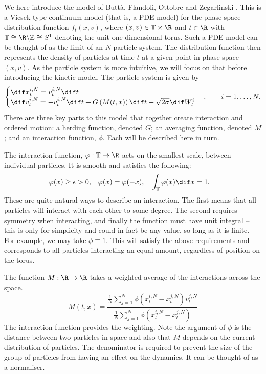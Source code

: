 We here introduce the model of Butt\`a, Flandoli, Ottobre and Zegarlinski \cite{Butta2019}. This is a Vicsek-type continuum model (that is, a PDE model) for the phase-space distribution function  $f_t(x,v)$, where $(x,v) \in \T \times \R$ and $t \in \R$ with $\T \cong \R \backslash \Z \cong S^1$ denoting the unit one-dimensional torus. Such a PDE model can be thought of as the limit of an $N$ particle system. The distribution function then represents the density of particles at time $t$ at a given point in phase space $(x,v)$. As the particle system is more intuitive, we will focus on that before introducing the kinetic model. The particle system is given by 
 \begin{equation}\label{eq:fullparticle}\begin{cases}
\dif x^{i,N}_t = v^{i,N}_t\dif t\\
\dif v^{i,N}_t = -v^{i,N}_t\dif t + G\left(M(t,x)\right)\dif t + \sqrt{2\sigma} \dif W^i_t 
\end{cases}, \qquad  i = 1,\dots,N.
\end{equation}
 There are three key parts to this model that together create interaction and ordered motion: a herding function, denoted $G$; an averaging function, denoted $M$; and an interaction function, $\phi$. Each will be described here in turn.
 
The interaction function, $\phi: \T \to \R $ acts on the smallest scale, between individual particles. It is smooth and satisfies the following:
 \begin{align}\label{eq:phi}
 \phi(x) \geq \epsilon >0, && \phi(x) = \phi(-x), &&& \int_{\T} \phi(x) \dif x = 1.
 \end{align}
 These are quite natural ways to describe an interaction. The first means that all particles will interact with each other to some degree. The second requires symmetry when interacting, and finally the function must have unit integral -- this is only for simplicity and could in fact be any value, so long as it is finite. For example, we may take $\phi \equiv 1$. This will satisfy the above requirements and corresponds to all particles interacting an equal amount, regardless of position on the torus.
 
 The function $M:\R \to \R$ takes a weighted average of the interactions across the space.	
 \[ 
 M(t,x) = \frac{\frac{1}{N}\sum_{j=1}^N \phi(x_t^{i,N} - x_t^{j,N})v^{j,N}_t  }{\frac{1}{N}\sum_{j=1}^N \phi(x_t^{i,N} - x_t^{j,N})}    
 \]
 The interaction function provides the weighting. Note the argument of  $\phi$ is the distance between two particles in space and also that $M$ depends on the current distribution of particles. The denominator is required to prevent the size of the group of particles from having an effect on the dynamics. It can be thought of as a normaliser.
 

